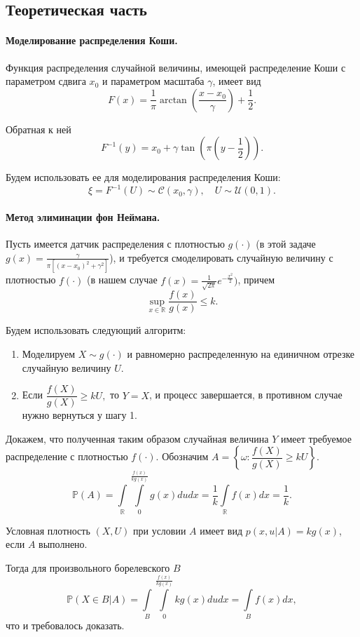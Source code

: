 \documentclass[16pt]{article}
\newcommand\Real{\mathbb{R}}
\newcommand\A{(\cdot)}
\newcommand\Int[2]{\int\limits_{#1}^{#2}}
\newcommand{\Prb}{\mathbb{P}}
\begin{document}
\subsection{Теоретическая часть}
\paragraph{Моделирование распределения Коши.}
Функция распределения случайной величины, имеющей распределение Коши с параметром сдвига $x_0$ и параметром масштаба $\gamma$, имеет вид
$$F(x) = \frac{1}{\pi} \arctan\left(\frac{x-x_0}{\gamma}\right) + \frac12.$$

Обратная к ней
$$F^{-1}(y) = x_0 + \gamma \tan\left(\pi\left(y - \frac12\right)\right).$$

Будем использовать ее для моделирования распределения Коши:
$$\xi = F^{-1}(U) \sim \mathcal{C}(x_0, \gamma), \quad U \sim \mathcal{U}(0, 1).$$

\paragraph{Метод элиминации фон Неймана.}
Пусть имеется датчик распределения с плотностью $g(\cdot)$ (в этой задаче 
$g(x) = \frac{\gamma}{\pi[(x - x_0)^2 + \gamma^2]}$), и требуется смоделировать случайную величину с плотностью $f(\cdot)$ (в нашем случае $f(x) = \frac{1}{\sqrt{2\pi}}e^{-\frac{x^2}{2}})$, причем
$$\sup_{x \in \Real} \frac{f(x)}{g(x)} \leq k.$$

Будем использовать следующий алгоритм:
\begin{enumerate}
	\item Моделируем $X \sim g\A$ и равномерно распределенную на единичном отрезке случайную  величину $U$.
	\item Если $\dfrac{f(X)}{g(X)} \geq kU,$
то $Y = X$, и процесс завершается, в противном случае нужно вернуться у шагу 1.
\end{enumerate} 

Докажем, что полученная таким образом случайная величина $Y$ имеет требуемое распределение с плотностью $f\A$.
Обозначим $A = \left\{\omega\colon \dfrac{f(X)}{g(X)} \geq kU\right\}$.
$$\Prb(A) = \int\limits_\Real\Int{0}{\frac{f(x)}{kg(x)}}g(x)dudx = \dfrac{1}{k}\int\limits_\Real f(x)dx = \dfrac{1}{k}.$$

Условная плотность $(X, U)$ при условии $A$ имеет вид
$p(x, u | A) = kg(x)$, если $A$ выполнено.

Тогда для произвольного борелевского $B$
$$\Prb(X \in B | A) = \int\limits_B\Int{0}{\frac{f(x)}{kg(x)}}kg(x)dudx = \int\limits_B f(x) dx,$$
что и требовалось доказать.
\end{document}
